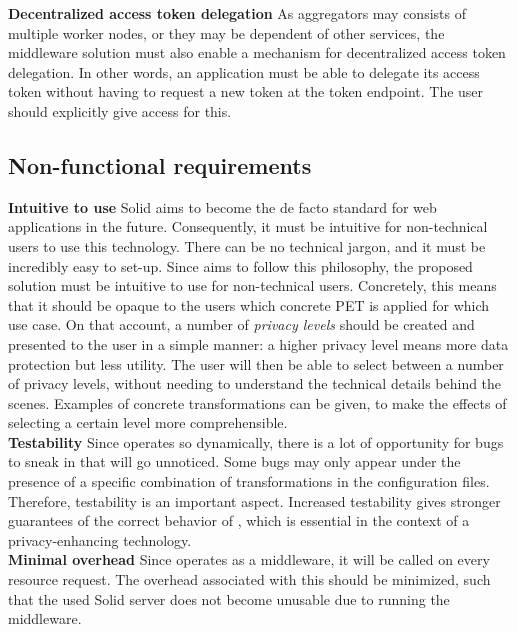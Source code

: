 \noindent \textbf{Decentralized access token delegation} As aggregators may consists of multiple worker nodes, or they may be dependent of other services, the middleware solution must also enable a mechanism for decentralized access token delegation. In other words, an application must be able to delegate its access token without having to request a new token at the token endpoint. The user should explicitly give access for this.

\subsection{Non-functional requirements}
\textbf{Intuitive to use} Solid aims to become the de facto standard for web applications in the future. Consequently, it must be intuitive for non-technical users to use this technology. There can be no technical jargon, and it must be incredibly easy to set-up. Since \middleware{} aims to follow this philosophy, the proposed solution must be intuitive to use for non-technical users.  Concretely, this means that it should be opaque to the users which concrete PET is applied for which use case. On that account, a number of \textit{privacy levels} should be created and presented to the user in a simple manner: a higher privacy level means more data protection but less utility. The user will then be able to select between a number of privacy levels, without needing to understand the technical details behind the scenes. Examples of concrete transformations can be given, to make the effects of selecting a certain level more comprehensible. \\

\noindent \textbf{Testability} Since \middleware{} operates so dynamically, there is a lot of opportunity for bugs to sneak in that will go unnoticed. Some bugs may only appear under the presence of a specific combination of transformations in the configuration files. Therefore, testability is an important aspect. Increased testability gives stronger guarantees of the correct behavior of \middleware{}, which is essential in the context of a privacy-enhancing technology. \\

\noindent \textbf{Minimal overhead} Since \middleware{} operates as a middleware, it will be called on every resource request. The overhead associated with this should be minimized, such that the used Solid server does not become unusable due to running the middleware.

